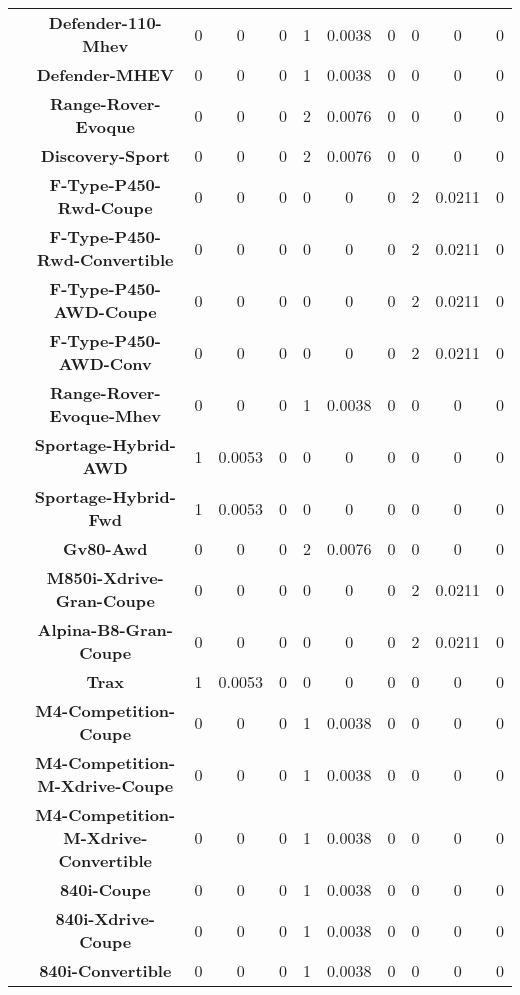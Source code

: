 \begin{center}
\begin{tabular}{|c|c||@{\hspace{1ex}}||c|c|c||@{\hspace{1ex}}||c|c|c||@{\hspace{1ex}}||c|c|c||@{\hspace{1ex}}||}
\cline{2-11}
  & {\bf Defender-110-Mhev} & 0 & 0 & 0 & 1 & 0.0038 & 0 & 0 & 0 & 0 \\
\cline{2-11}
  & {\bf Defender-MHEV} & 0 & 0 & 0 & 1 & 0.0038 & 0 & 0 & 0 & 0 \\
\cline{2-11}
  & {\bf Range-Rover-Evoque} & 0 & 0 & 0 & 2 & 0.0076 & 0 & 0 & 0 & 0 \\
\cline{2-11}
  & {\bf Discovery-Sport} & 0 & 0 & 0 & 2 & 0.0076 & 0 & 0 & 0 & 0 \\
\cline{2-11}
  & {\bf F-Type-P450-Rwd-Coupe} & 0 & 0 & 0 & 0 & 0 & 0 & 2 & 0.0211 & 0 \\
\cline{2-11}
  & {\bf F-Type-P450-Rwd-Convertible} & 0 & 0 & 0 & 0 & 0 & 0 & 2 & 0.0211 & 0 \\
\cline{2-11}
  & {\bf F-Type-P450-AWD-Coupe} & 0 & 0 & 0 & 0 & 0 & 0 & 2 & 0.0211 & 0 \\
\cline{2-11}
  & {\bf F-Type-P450-AWD-Conv} & 0 & 0 & 0 & 0 & 0 & 0 & 2 & 0.0211 & 0 \\
\cline{2-11}
  & {\bf Range-Rover-Evoque-Mhev} & 0 & 0 & 0 & 1 & 0.0038 & 0 & 0 & 0 & 0 \\
\cline{2-11}
  & {\bf Sportage-Hybrid-AWD} & 1 & 0.0053 & 0 & 0 & 0 & 0 & 0 & 0 & 0 \\
\cline{2-11}
  & {\bf Sportage-Hybrid-Fwd} & 1 & 0.0053 & 0 & 0 & 0 & 0 & 0 & 0 & 0 \\
\cline{2-11}
  & {\bf Gv80-Awd} & 0 & 0 & 0 & 2 & 0.0076 & 0 & 0 & 0 & 0 \\
\cline{2-11}
  & {\bf M850i-Xdrive-Gran-Coupe} & 0 & 0 & 0 & 0 & 0 & 0 & 2 & 0.0211 & 0 \\
\cline{2-11}
  & {\bf Alpina-B8-Gran-Coupe} & 0 & 0 & 0 & 0 & 0 & 0 & 2 & 0.0211 & 0 \\
\cline{2-11}
  & {\bf Trax} & 1 & 0.0053 & 0 & 0 & 0 & 0 & 0 & 0 & 0 \\
\cline{2-11}
  & {\bf M4-Competition-Coupe} & 0 & 0 & 0 & 1 & 0.0038 & 0 & 0 & 0 & 0 \\
\cline{2-11}
  & {\bf M4-Competition-M-Xdrive-Coupe} & 0 & 0 & 0 & 1 & 0.0038 & 0 & 0 & 0 & 0 \\
\cline{2-11}
  & {\bf M4-Competition-M-Xdrive-Convertible} & 0 & 0 & 0 & 1 & 0.0038 & 0 & 0 & 0 & 0 \\
\cline{2-11}
  & {\bf 840i-Coupe} & 0 & 0 & 0 & 1 & 0.0038 & 0 & 0 & 0 & 0 \\
\cline{2-11}
  & {\bf 840i-Xdrive-Coupe} & 0 & 0 & 0 & 1 & 0.0038 & 0 & 0 & 0 & 0 \\
\cline{2-11}
  & {\bf 840i-Convertible} & 0 & 0 & 0 & 1 & 0.0038 & 0 & 0 & 0 & 0 \\

\end{tabular}
\end{center}
